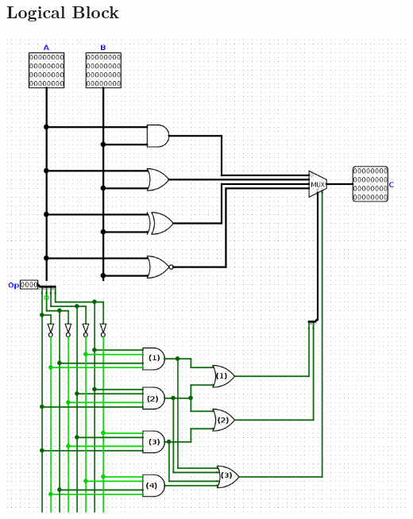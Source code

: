 \documentclass{article}
\begin{document}
\subsection{Logical Block}
\begin{center}
    \includegraphics[width=1\textwidth]{images/Logical32.png}
\end{center}
\end{document}
